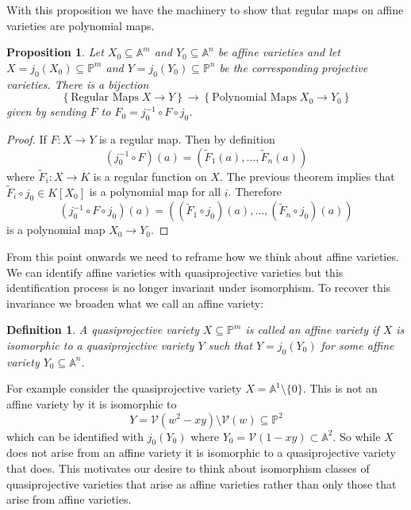 \documentclass[40pt]{article}
\newtheorem{definition}{Definition}[section]
\newcommand{\Proj}{\mathbb{P}}
\newcommand{\A}{\mathbb{A}}
\newcommand{\V}{\mathcal{V}}
\newtheorem{proposition}{Proposition}[section]
\theoremstyle{remark}
\begin{document}
				With this proposition we have the machinery to show that regular maps on affine varieties are polynomial maps. 
				\begin{proposition}
					Let $X_0 \subseteq \A^m$ and $Y_0 \subseteq \A^n$ be affine varieties and let $X = j_0(X_0) \subseteq \Proj^m$ and $Y = j_0(Y_0)\subseteq \Proj^n$ be the corresponding projective varieties. There is a bijection 
					\[
					\left \{ \text{Regular Maps} \; X \to Y  \right\} \to \left \{\text{Polynomial Maps} \; X_0 \to Y_0  \right\}
					\]
					given by sending $F$ to $F_0 = j_0^{-1}\circ F \circ j_0$.
				\end{proposition}
				\begin{proof}
					If $F: X \to Y$ is a regular map. Then by definition 
					\[
					(j_0^{-1} \circ F)(a) = (\tilde{F}_1(a),\dots,\tilde{F}_n(a))
					\]
					where $\tilde{F}_i : X \to K$ is a regular function on $X$. The previous theorem implies that $\tilde{F}_i \circ j_0 \in K[X_0]$ is a polynomial map for all $i$. Therefore 
					\[
					(j_0^{-1} \circ F \circ j_0 )(a) = ((\tilde{F}_1\circ j_0)(a), \dots,(\tilde{F}_n \circ j_0)(a))
					\]
					is a polynomial map $X_0 \to Y_0$. 
				\end{proof}
				From this point onwards we need to reframe how we think about affine varieties. We can identify affine varieties with quasiprojective varieties but this identification process is no longer invariant under isomorphism. To recover this invariance we broaden what we call an affine variety:
				\begin{definition}
					A quasiprojective variety $X \subseteq \Proj^m$ is called an affine variety if $X$ is isomorphic to a quasiprojective variety $Y$ such that $Y = j_0(Y_0)$ for some affine variety $Y_0 \subseteq \A^n$. 
				\end{definition}
				For example consider the quasiprojective variety $X = \A^1 \setminus \{0\}$. This is not an affine variety by it is isomorphic to 
				\[
				Y = \V(w^2 - xy) \setminus \V(w) \subseteq\Proj^2
				\]
			which can be identified with $j_0(Y_0)$ where $Y_0 = \V(1-xy) \subset \A^2$. So while $X$ does not arise from an affine variety it is isomorphic to a quasiprojective variety that does. This motivates our desire to think about isomorphism classes of quasiprojective varieties that arise as affine varieties rather than only those that arise from affine varieties. 
\end{document}
